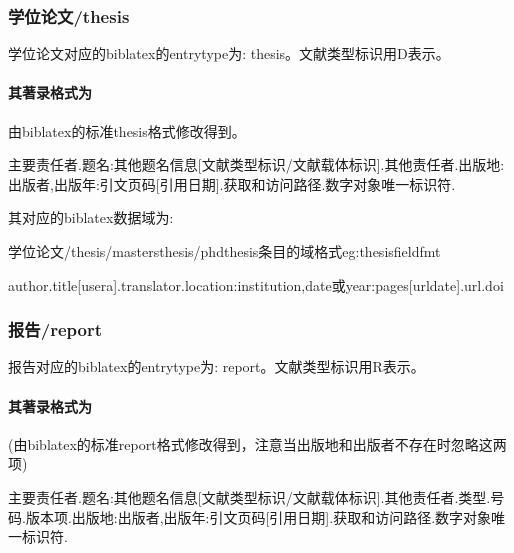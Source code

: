 \subsubsection{学位论文/thesis}
\begin{refentry}{}{}
学位论文对应的biblatex的entrytype为: thesis。文献类型标识用D表示。

\paragraph{其著录格式为} 由biblatex的标准thesis格式修改得到。

主要责任者.题名:其他题名信息[文献类型标识/文献载体标识].其他责任者.出版地:出版者,出版年:引文页码[引用日期].获取和访问路径.数字对象唯一标识符.
\end{refentry}

其对应的biblatex数据域为:
\begin{example}{学位论文/thesis/mastersthesis/phdthesis条目的域格式}{eg:thesisfieldfmt}
\begin{texlist}
author.title[usera].translator.location:institution,date或year:pages[urldate].url.doi
\end{texlist}
\end{example}


\subsubsection{报告/report}
\begin{refentry}{}{}
报告对应的biblatex的entrytype为: report。文献类型标识用R表示。

\paragraph{其著录格式为} (由biblatex的标准report格式修改得到，注意当出版地和出版者不存在时忽略这两项)

主要责任者.题名:其他题名信息[文献类型标识/文献载体标识].其他责任者.类型.号码.版本项.出版地:出版者,出版年:引文页码[引用日期].获取和访问路径.数字对象唯一标识符.
\end{refentry}

